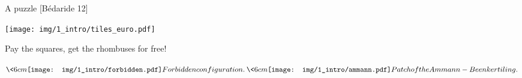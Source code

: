 %
%		
%		
%
%		
%		
%

\begin{frame}{A puzzle [Bédaride \etal{} 12]}

\centering
\texttt{[image: img/1\_intro/tiles\_euro.pdf]}

Pay the squares, get the rhombuses for free!

\(
\<{6cm}
\centering
\texttt{[image: img/1\_intro/forbidden.pdf]}

Forbidden configuration.
\>

\<{6cm}
\centering
\texttt{[image: img/1\_intro/ammann.pdf]}

Patch of the Ammann-Beenker tiling.
\>
\)

\end{frame}